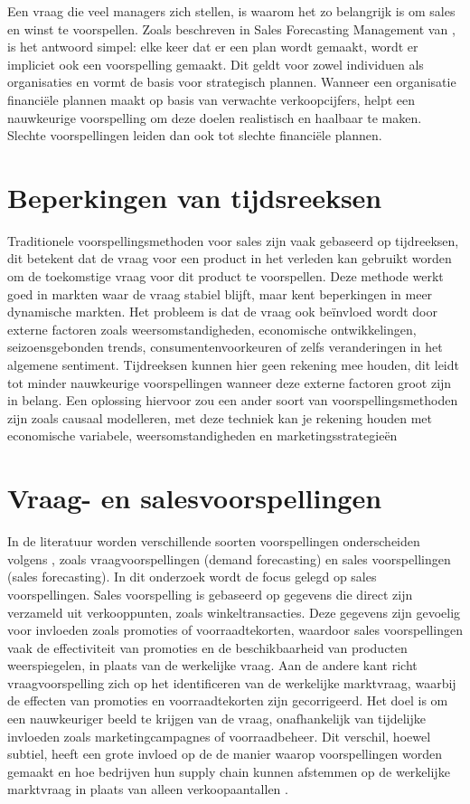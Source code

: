 Een vraag die veel managers zich stellen, is waarom het zo belangrijk is om sales en winst te voorspellen. Zoals beschreven in Sales Forecasting Management van \textcite{JohnT.Mentzer2004}, is het antwoord simpel: elke keer dat er een plan wordt gemaakt, wordt er impliciet ook een voorspelling gemaakt. Dit geldt voor zowel individuen als organisaties en vormt de basis voor strategisch plannen. Wanneer een organisatie financiële plannen maakt op basis van verwachte verkoopcijfers, helpt een nauwkeurige voorspelling om deze doelen realistisch en haalbaar te maken. Slechte voorspellingen leiden dan ook tot slechte financiële plannen.


\section{Beperkingen van tijdsreeksen}  
Traditionele voorspellingsmethoden voor sales zijn vaak gebaseerd op tijdreeksen, dit betekent dat de vraag voor een product in het verleden kan gebruikt worden om de toekomstige vraag voor dit product te voorspellen. Deze methode werkt goed in markten waar de vraag stabiel blijft, maar kent beperkingen in meer dynamische markten. Het probleem is dat de vraag ook beïnvloed wordt door externe factoren zoals weersomstandigheden, economische ontwikkelingen, seizoensgebonden trends, consumentenvoorkeuren of zelfs veranderingen in het algemene sentiment. Tijdreeksen kunnen hier geen rekening mee houden, dit leidt tot minder nauwkeurige voorspellingen wanneer deze externe factoren groot zijn in belang. Een oplossing hiervoor zou een ander soort van voorspellingsmethoden zijn zoals causaal modelleren, met deze techniek kan je rekening houden met economische variabele, weersomstandigheden en marketingsstrategieën \autocite{UsugaCadavid2018}

\section{Vraag- en salesvoorspellingen}  
 

In de literatuur worden verschillende soorten voorspellingen onderscheiden volgens \textcite{UsugaCadavid2018}, zoals vraagvoorspellingen (demand forecasting) en sales voorspellingen (sales forecasting). In dit onderzoek wordt de focus gelegd op sales voorspellingen. Sales voorspelling is gebaseerd op gegevens die direct zijn verzameld uit verkooppunten, zoals winkeltransacties. Deze gegevens zijn gevoelig voor invloeden zoals promoties of voorraadtekorten, waardoor sales voorspellingen vaak de effectiviteit van promoties en de beschikbaarheid van producten weerspiegelen, in plaats van de werkelijke vraag. Aan de andere kant richt vraagvoorspelling zich op het identificeren van de werkelijke marktvraag, waarbij de effecten van promoties en voorraadtekorten zijn gecorrigeerd. Het doel is om een nauwkeuriger beeld te krijgen van de vraag, onafhankelijk van tijdelijke invloeden zoals marketingcampagnes of voorraadbeheer. Dit verschil, hoewel subtiel, heeft een grote invloed op de de manier waarop voorspellingen worden gemaakt en hoe bedrijven hun supply chain kunnen afstemmen op de werkelijke marktvraag in plaats van alleen verkoopaantallen .




